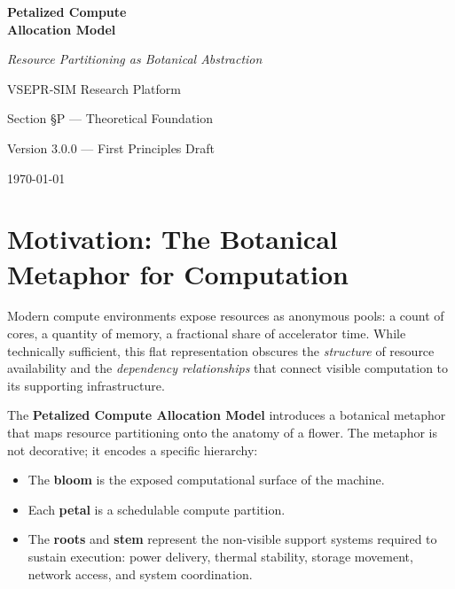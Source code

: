 \documentclass[11pt, a4paper, oneside]{article}
\theoremstyle{definition}
\begin{document}

\begin{titlepage}
\centering
\vspace*{3cm}

{\Huge\bfseries Petalized Compute\\[6pt] Allocation Model\par}
\vspace{1.0cm}
{\Large\itshape Resource Partitioning as Botanical Abstraction\par}
\vspace{1.5cm}
{\large VSEPR-SIM Research Platform\par}
\vspace{0.5cm}
{\large Section §P — Theoretical Foundation\par}
\vspace{2.0cm}
{\normalsize Version 3.0.0 — First Principles Draft\par}
\vfill
{\small\today}
\end{titlepage}

\tableofcontents
\newpage

\section{Motivation: The Botanical Metaphor for Computation}

Modern compute environments expose resources as anonymous pools: a count of
cores, a quantity of memory, a fractional share of accelerator time.  While
technically sufficient, this flat representation obscures the \emph{structure}
of resource availability and the \emph{dependency relationships} that connect
visible computation to its supporting infrastructure.

The \textbf{Petalized Compute Allocation Model} introduces a botanical
metaphor that maps resource partitioning onto the anatomy of a flower.
The metaphor is not decorative; it encodes a specific hierarchy:

\begin{itemize}
  \item The \textbf{bloom} is the exposed computational surface of the machine.
  \item Each \textbf{petal} is a schedulable compute partition.
  \item The \textbf{roots} and \textbf{stem} represent the non-visible support
        systems required to sustain execution: power delivery, thermal
        stability, storage movement, network access, and system coordination.
\end{itemize}
\end{document}
